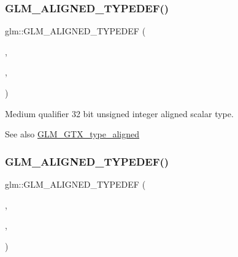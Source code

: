 \subsubsection{\texorpdfstring{G\+L\+M\+\_\+\+A\+L\+I\+G\+N\+E\+D\+\_\+\+T\+Y\+P\+E\+D\+E\+F()}{GLM\_ALIGNED\_TYPEDEF()}\hspace{0.1cm}{\footnotesize\ttfamily [91/209]}}
{\footnotesize\ttfamily glm\+::\+G\+L\+M\+\_\+\+A\+L\+I\+G\+N\+E\+D\+\_\+\+T\+Y\+P\+E\+D\+EF (\begin{DoxyParamCaption}\item[{\hyperlink{group__gtc__type__precision_gad0c27a525045c299a92306eb4cd7c13a}{mediump\+\_\+u32}}]{,  }\item[{aligned\+\_\+mediump\+\_\+u32}]{,  }\item[{4}]{ }\end{DoxyParamCaption})}

Medium qualifier 32 bit unsigned integer aligned scalar type. \begin{DoxySeeAlso}{See also}
\hyperlink{group__gtx__type__aligned}{G\+L\+M\+\_\+\+G\+T\+X\+\_\+type\+\_\+aligned} 
\end{DoxySeeAlso}
\mbox{\label{group__gtx__type__aligned_gaa0fc531cbaa972ac3a0b86d21ef4a7fa}} 
\subsubsection{\texorpdfstring{G\+L\+M\+\_\+\+A\+L\+I\+G\+N\+E\+D\+\_\+\+T\+Y\+P\+E\+D\+E\+F()}{GLM\_ALIGNED\_TYPEDEF()}\hspace{0.1cm}{\footnotesize\ttfamily [92/209]}}
{\footnotesize\ttfamily glm\+::\+G\+L\+M\+\_\+\+A\+L\+I\+G\+N\+E\+D\+\_\+\+T\+Y\+P\+E\+D\+EF (\begin{DoxyParamCaption}\item[{\hyperlink{group__gtc__type__precision_ga00c51a16fa190b0a90205d50d6d8a44a}{mediump\+\_\+u64}}]{,  }\item[{aligned\+\_\+mediump\+\_\+u64}]{,  }\item[{8}]{ }\end{DoxyParamCaption})}

